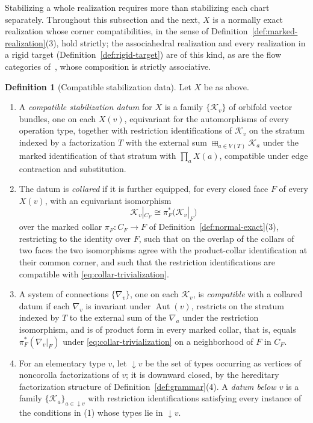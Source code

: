 \documentclass[11pt,letterpaper,twoside]{article}
\theoremstyle{plain}
\theoremstyle{definition}
\newtheorem{definition}[theorem]{Definition}
\theoremstyle{remark}
\let\cite\citep
\newcommand{\below}[1]{{\downarrow}#1}
\begin{document}
Stabilizing a whole realization requires more than stabilizing each chart separately.  Throughout this subsection and the next, \(X\) is a normally exact realization whose corner compatibilities, in the sense of Definition~\ref{def:marked-realization}(3), hold strictly; the associahedral realization and every realization in a rigid target (Definition~\ref{def:rigid-target}) are of this kind, as are the flow categories of~\cite{abouzaidblumberg2024}, whose composition is strictly associative.

\begin{definition}[Compatible stabilization data]\label{def:stabilization-datum}
Let \(X\) be as above.
\begin{enumerate}
\item A \emph{compatible stabilization datum} for \(X\) is a family \(\{\mathcal K_v\}\) of orbifold vector bundles, one on each \(X(v)\), equivariant for the automorphisms of every operation type, together with restriction identifications of \(\mathcal K_{v}\) on the stratum indexed by a factorization \(T\) with the external sum \(\boxplus_{a\in V(T)}\mathcal K_a\) under the marked identification of that stratum with \(\prod_a X(a)\), compatible under edge contraction and substitution.
\item The datum is \emph{collared} if it is further equipped, for every closed face \(F\) of every \(X(v)\), with an equivariant isomorphism
\begin{equation}\label{eq:collar-trivialization}
 \mathcal K_v|_{C_F}\cong\pi_F^*\bigl(\mathcal K_v|_F\bigr)
\end{equation}
over the marked collar \(\pi_F:C_F\to F\) of Definition~\ref{def:normal-exact}(3), restricting to the identity over \(F\), such that on the overlap of the collars of two faces the two isomorphisms agree with the product-collar identification at their common corner, and such that the restriction identifications are compatible with \eqref{eq:collar-trivialization}.
\item A system of connections \(\{\nabla_v\}\), one on each \(\mathcal K_v\), is \emph{compatible} with a collared datum if each \(\nabla_v\) is invariant under \(\operatorname{Aut}(v)\), restricts on the stratum indexed by \(T\) to the external sum of the \(\nabla_a\) under the restriction isomorphism, and is of product form in every marked collar, that is, equals \(\pi_F^*(\nabla_v|_F)\) under \eqref{eq:collar-trivialization} on a neighborhood of \(F\) in \(C_F\).
\item For an elementary type \(v\), let \(\below{v}\) be the set of types occurring as vertices of noncorolla factorizations of \(v\); it is downward closed, by the hereditary factorization structure of Definition~\ref{def:grammar}(4).  A \emph{datum below \(v\)} is a family \(\{\mathcal K_a\}_{a\in\below{v}}\) with restriction identifications satisfying every instance of the conditions in (1) whose types lie in \(\below{v}\).
\end{enumerate}
\end{definition}
\end{document}
